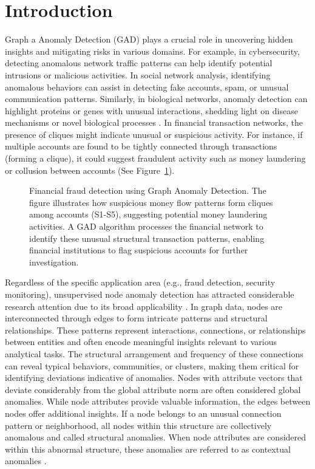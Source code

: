 \documentclass[pdflatex,sn-mathphys-num]{sn-jnl}%
\theoremstyle{thmstyleone}%
\theoremstyle{thmstyletwo}%
\theoremstyle{thmstylethree}%
\begin{document}
\section{Introduction}\label{sec:intro}
Graph a Anomaly Detection (GAD) plays a crucial role in uncovering hidden insights and mitigating risks in various domains. For example, in cybersecurity, detecting anomalous network traffic patterns can help identify potential intrusions or malicious activities. In social network analysis, identifying anomalous behaviors can assist in detecting fake accounts, spam, or unusual communication patterns. Similarly, in biological networks, anomaly detection can highlight proteins or genes with unusual interactions, shedding light on disease mechanisms or novel biological processes \cite{akoglu2015graph, Ma_2023,Ruff_2021}. In financial transaction networks, the presence of cliques might indicate unusual or suspicious activity. For instance, if multiple accounts are found to be tightly connected through transactions (forming a clique), it could suggest fraudulent activity such as money laundering or collusion between accounts (See Figure~\ref{fig:gad_concept}).
\begin{figure}[H]
   \centering
   \resizebox{\linewidth}{!}{}
   \caption{Financial fraud detection using Graph Anomaly Detection. The figure illustrates how suspicious money flow patterns form cliques among accounts (S1-S5), suggesting potential money laundering activities. A GAD algorithm processes the financial network to identify these unusual structural transaction patterns, enabling financial institutions to flag suspicious accounts for further investigation.}
   \label{fig:gad_concept}
\end{figure}

Regardless of the specific application area (e.g., fraud detection, security monitoring), unsupervised node anomaly detection has attracted considerable research attention due to its broad applicability \cite{NEURIPS2022-acc1ec4a,Ma_2023}. In graph data, nodes are interconnected through edges to form intricate patterns and structural relationships. These patterns represent interactions, connections, or relationships between entities and often encode meaningful insights relevant to various analytical tasks. The structural arrangement and frequency of these connections can reveal typical behaviors, communities, or clusters, making them critical for identifying deviations indicative of anomalies. Nodes with attribute vectors that deviate considerably from the global attribute norm are often considered global anomalies. While node attributes provide valuable information, the edges between nodes offer additional insights. If a node belongs to an unusual connection pattern or neighborhood, all nodes within this structure are collectively anomalous and called structural anomalies. When node attributes are considered within this abnormal structure, these anomalies are referred to as contextual anomalies \cite{NEURIPS2022-acc1ec4a,Ma_2023}.
\end{document}
